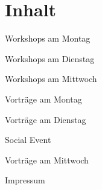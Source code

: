 \section*{Inhalt}

\vspace*{0.35em}%
\noindent Workshops am Montag \dotfill \pageref{montag-workshops}

\vspace*{0.35em}%
\noindent Workshops am Dienstag \dotfill \pageref{dienstag-workshops}

\vspace*{0.35em}%
\noindent Workshops am Mittwoch \dotfill \pageref{mittwoch-workshops}

\vspace*{0.35em}%
\noindent Vorträge am Montag \dotfill \pageref{montag}

\vspace*{0.35em}%
\noindent Vorträge am Dienstag \dotfill \pageref{dienstag}

\vspace*{0.35em}%
\noindent Social Event \dotfill %

\vspace*{0.35em}%
\noindent Vorträge am Mittwoch \dotfill \pageref{mittwoch}

\vspace*{0.35em}%
\noindent Impressum \dotfill \pageref{impressum}
